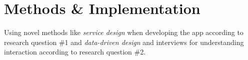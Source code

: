 \chapter{Methods \& Implementation}\label{cha:Method}





Using novel methods like \textit{service design} when developing the app according to research question \#1 and \textit{data-driven design} and interviews for understanding interaction according to research question \#2.






